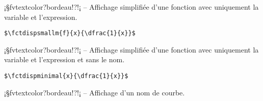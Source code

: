 \documentclass[11pt,a4paper,rgb]{report}
\begin{document}
\setlength{\leftskip}{0pt}
\setlength{\textwidth}{18cm}%


\vspace*{.75cm}

\inCodeStub¡§fvtextcolor?bordeau!?!¡ -- Affichage simplifiée d'une fonction avec uniquement la variable et l'expression.

\setlength{\leftskip}{.75cm}%
\setlength{\textwidth}{17.25cm}%

\colorbox{blue!15}{}
\hfill
\begin{minipage}{.65\textwidth}
	\begin{lstlisting}[linewidth=\textwidth, language={[LaTeX]TeX}]
	$\fctdispsmallm{f}{x}{\dfrac{1}{x}}$
	\end{lstlisting}
\end{minipage}

\setlength{\leftskip}{0pt}
\setlength{\textwidth}{18cm}%


\vspace*{.75cm}

\inCodeStub¡§fvtextcolor?bordeau!?!¡ -- Affichage simplifiée d'une fonction avec uniquement la variable et l'expression et sans le nom.

\setlength{\leftskip}{.75cm}%
\setlength{\textwidth}{17.25cm}%

\colorbox{blue!15}{}
\hfill
\begin{minipage}{.65\textwidth}
	\begin{lstlisting}[linewidth=\textwidth, language={[LaTeX]TeX}]
	$\fctdispminimal{x}{\dfrac{1}{x}}$
	\end{lstlisting}
\end{minipage}

\setlength{\leftskip}{0pt}
\setlength{\textwidth}{18cm}%


\vspace*{.75cm}

\inCodeStub¡§fvtextcolor?bordeau!?!¡ -- Affichage d'un nom de courbe.

\setlength{\leftskip}{.75cm}%
\setlength{\textwidth}{17.25cm}%
\end{document}
